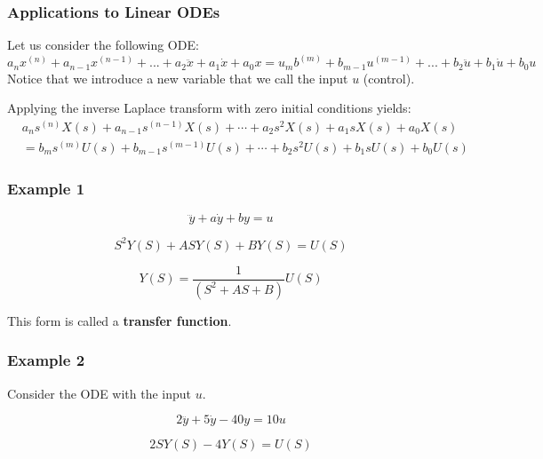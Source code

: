 \subsubsection{Applications to Linear ODEs}

Let us consider the following ODE:
\begin{equation}
    a_{n}x^{(n)} +a_{n-1}x^{(n-1)}+...+a_{2}\ddot x+a_{1}\dot x + a_0 x= u_{m}b^{(m)} +b_{m-1}u^{(m-1)}+...+b_{2}\ddot u+b_{1}\dot u + b_0 u
\end{equation}
Notice that we introduce a new variable that we call the input \(u\) (control).

Applying the inverse Laplace transform with zero initial conditions yields:
\begin{equation}
    \begin{aligned}
        &a_{n}s^{(n)}X(s) +a_{n-1}s^{(n-1)}X(s)+\cdots+a_{2} s^2 X(s)+a_{1}s X(s) + a_0 X(s) \\
        &= b_{m}s^{(m)}U(s) +b_{m-1}s^{(m-1)}U(s)+\cdots+b_{2}s^2 U(s)+b_{1}sU(s) + b_0 U(s)
    \end{aligned}
\end{equation}


\subsubsection*{Example 1}
\begin{equation}
    \dddot y + a\dot y + by = u
\end{equation}

\begin{equation}
    S^2 Y(S) + ASY(S) + BY(S) = U(S)
\end{equation}

\begin{equation}
    Y(S) = \frac{1}{(S^2 + AS + B)} U(S)
\end{equation}

This form is called a \textbf{transfer function}. 

\subsubsection*{Example 2}
Consider the ODE with the input \(u\). 

\begin{equation}
    2 \dddot y + 5 \dot y - 40 y = 10 u
\end{equation}

\begin{equation}
    2SY(S) - 4Y(S) = U(S)
\end{equation}


